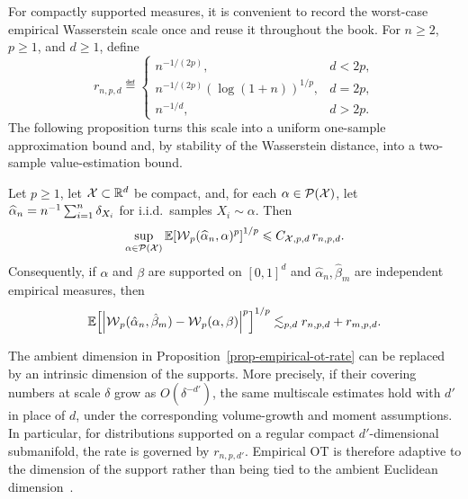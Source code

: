 For compactly supported measures, it is convenient to record the worst-case empirical Wasserstein scale once and reuse it throughout the book. For \(n\geq2\), \(p\geq1\), and \(d\geq1\), define
\begin{equation}\label{eq-empirical-wasserstein-scale}
	r_{n,p,d}
	\eqdef
	\begin{cases}
		n^{-1/(2p)}, & d<2p,\\
		n^{-1/(2p)}(\log(1+n))^{1/p}, & d=2p,\\
		n^{-1/d}, & d>2p.
	\end{cases}
\end{equation}
The following proposition turns this scale into a uniform one-sample approximation bound and, by stability of the Wasserstein distance, into a two-sample value-estimation bound.

\begin{prop}\label{prop-empirical-ot-rate}
	Let \(p\geq1\), let \(\mathcal{X}\subset\mathbb{R}^d\) be compact, and, for each \(\alpha\in\mathcal{P}(\mathcal{X})\), let \(\widehat\alpha_n=n^{-1}\sum_{i=1}^n\delta_{X_i}\) for i.i.d.\ samples \(X_i\sim\alpha\). Then
	\begin{equation}\label{eq-empirical-wasserstein-moment-scale}
		\sup_{\alpha\in\mathcal{P}(\mathcal{X})}
		\mathbb{E}\!\left[\operatorname{\mathcal{W}}_p(\widehat\alpha_n,\alpha)^p\right]^{1/p}
		\leqslant
		C_{\mathcal{X},p,d}\,r_{n,p,d}.
	\end{equation}
	Consequently, if \(\alpha\) and \(\beta\) are supported on \([0,1]^d\) and \(\hat\alpha_n,\hat\beta_m\) are independent empirical measures, then
	\[
		\mathbb{E}\!\left[
			\left\lvert\operatorname{\mathcal{W}}_p(\hat\alpha_n,\hat\beta_m)-\operatorname{\mathcal{W}}_p(\alpha,\beta)\right\rvert^p
		\right]^{1/p}
		\lesssim_{p,d}
		r_{n,p,d}+r_{m,p,d}.
	\]
\end{prop}

\begin{rem}\label{rem-empirical-ot-intrinsic-dimension}
	The ambient dimension in Proposition~\ref{prop-empirical-ot-rate} can be replaced by an intrinsic dimension of the supports. More precisely, if their covering numbers at scale \(\delta\) grow as \(O(\delta^{-d'})\), the same multiscale estimates hold with \(d'\) in place of \(d\), under the corresponding volume-growth and moment assumptions. In particular, for distributions supported on a regular compact \(d'\)-dimensional submanifold, the rate is governed by \(r_{n,p,d'}\). Empirical OT is therefore adaptive to the dimension of the support rather than being tied to the ambient Euclidean dimension~\cite{dudley1969speed,weed2017sharp}.
\end{rem}

